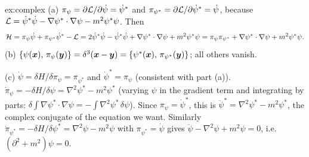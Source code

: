 \documentclass[11pt]{article}
\begin{document}
\begin{solution}{ex:complex}
(a) $\pi_\psi=\partial\mathcal{L}/\partial\dot\psi=\dot\psi^*$ and $\pi_{\psi^*}=\partial\mathcal{L}/\partial\dot\psi^*=\dot\psi$, because $\mathcal{L}=\dot\psi^*\dot\psi-\nabla\psi^*\cdot\nabla\psi-m^2\psi^*\psi$. Then
\[
 \mathcal{H}=\pi_\psi\dot\psi+\pi_{\psi^*}\dot\psi^*-\mathcal{L}=2\dot\psi^*\dot\psi-\dot\psi^*\dot\psi+\nabla\psi^*\cdot\nabla\psi+m^2\psi^*\psi=\pi_\psi\pi_{\psi^*}+\nabla\psi^*\cdot\nabla\psi+m^2\psi^*\psi .
\]
(b) $\left\{\psi(\bm{x}),\,\pi_\psi(\bm{y})\right\}=\delta^3(\bm{x}-\bm{y})=\left\{\psi^*(\bm{x}),\,\pi_{\psi^*}(\bm{y})\right\}$; all others vanish.

(c) $\dot\psi=\delta H/\delta\pi_\psi=\pi_{\psi^*}$ and $\dot\psi^*=\pi_\psi$ (consistent with part (a)). $\dot\pi_\psi=-\delta H/\delta\psi=\nabla^2\psi^*-m^2\psi^*$ (varying $\psi$ in the gradient term and integrating by parts: $\delta\!\int\nabla\psi^*\cdot\nabla\psi=-\int\nabla^2\psi^*\,\delta\psi$). Since $\pi_\psi=\dot\psi^*$, this is $\ddot\psi^*=\nabla^2\psi^*-m^2\psi^*$, the complex conjugate of the equation we want. Similarly $\dot\pi_{\psi^*}=-\delta H/\delta\psi^*=\nabla^2\psi-m^2\psi$ with $\pi_{\psi^*}=\dot\psi$ gives $\ddot\psi-\nabla^2\psi+m^2\psi=0$, i.e.\ $(\partial^2+m^2)\psi=0$. \checkmark
\end{solution}
\end{document}
